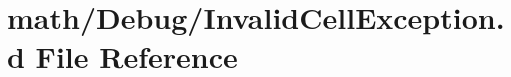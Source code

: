 \hypertarget{_invalid_cell_exception_8d}{\section{math/\+Debug/\+Invalid\+Cell\+Exception.d File Reference}
\label{_invalid_cell_exception_8d}
}

